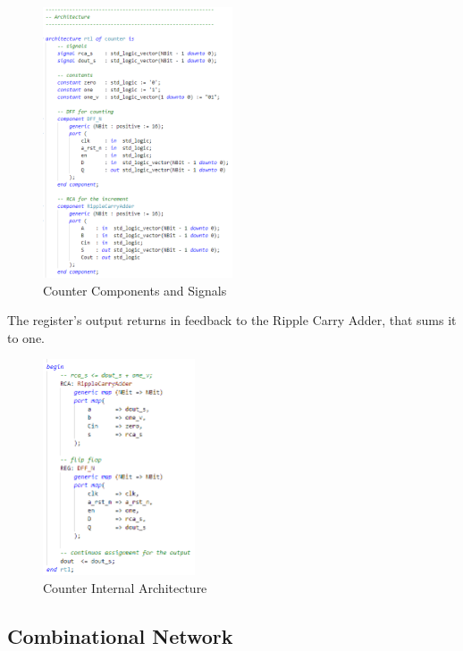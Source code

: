 \begin{figure}[H]
    \centering
    \includegraphics[width=0.5\textwidth]{img/Chapter3/Counter-architecture1.png}
    \caption{Counter Components and Signals}
    \label{fig:CA1}
\end{figure}

The register's output returns in feedback to the Ripple Carry Adder, that sums it to one.

\begin{figure}[H]
    \centering
    \includegraphics[width=0.4\textwidth]{img/Chapter3/Counter-architecture2.png}
    \caption{Counter Internal Architecture}
    \label{fig:CA2}
\end{figure}

\subsection{Combinational Network}

